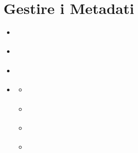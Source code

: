 \documentclass[letterpaper,10pt,english]{sphinxmanual}
\begin{document}
\section{Gestire i Metadati}
\label{\detokenize{it/03_gestire_metadati:gestire-i-metadati}}\label{\detokenize{it/03_gestire_metadati:metadata-it}}\label{\detokenize{it/03_gestire_metadati::doc}}
\begin{sphinxcontents}
\begin{itemize}
\item {} 
\sphinxAtStartPar
{}\label{\detokenize{it/03_gestire_metadati:id1}}{\hyperref[\detokenize{it/03_gestire_metadati:chi-puo-modificare-i-metadati}]{}}

\item {} 
\sphinxAtStartPar
{}\label{\detokenize{it/03_gestire_metadati:id2}}{\hyperref[\detokenize{it/03_gestire_metadati:aprire-l-editor-dei-metadati}]{}}

\item {} 
\sphinxAtStartPar
{}\label{\detokenize{it/03_gestire_metadati:id3}}{\hyperref[\detokenize{it/03_gestire_metadati:panoramica-dell-editor-dei-metadati}]{}}

\item {} 
\sphinxAtStartPar
{}\label{\detokenize{it/03_gestire_metadati:id4}}{\hyperref[\detokenize{it/03_gestire_metadati:modifica-dei-campi-principali-dei-metadati}]{}}
\begin{itemize}
\item {} 
\sphinxAtStartPar
{}\label{\detokenize{it/03_gestire_metadati:id5}}{\hyperref[\detokenize{it/03_gestire_metadati:titolo}]{}}

\item {} 
\sphinxAtStartPar
{}\label{\detokenize{it/03_gestire_metadati:id6}}{\hyperref[\detokenize{it/03_gestire_metadati:abstract}]{}}

\item {} 
\sphinxAtStartPar
{}\label{\detokenize{it/03_gestire_metadati:id7}}{\hyperref[\detokenize{it/03_gestire_metadati:parole-chiave}]{}}

\item {} 
\sphinxAtStartPar
{}\label{\detokenize{it/03_gestire_metadati:id8}}{\hyperref[\detokenize{it/03_gestire_metadati:categoria}]{}}


\end{itemize}
\end{itemize}
\end{sphinxcontents}
\end{document}
